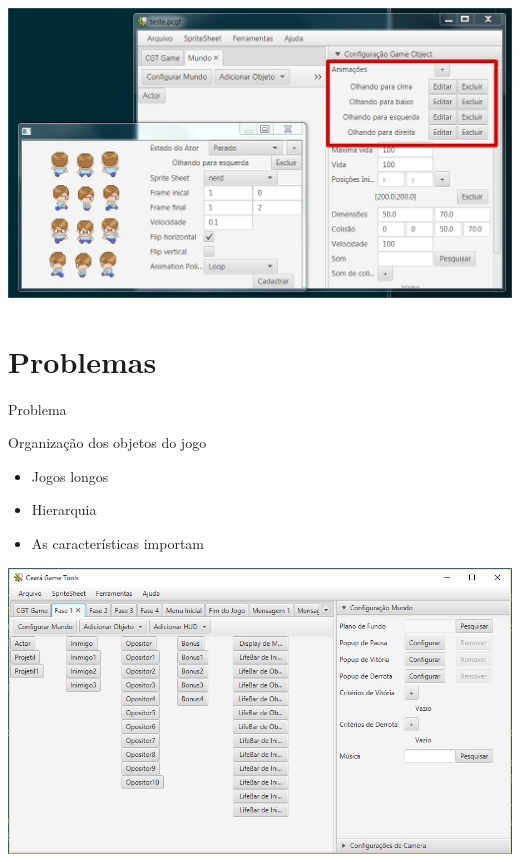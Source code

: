 \documentclass{beamer}
\begin{document}
   \begin{frame}
      \includegraphics[width=\textwidth]{images/problema-2.jpg}
   \end{frame}

   \section{Problemas}
   \begin{frame}{Problema}
      \begin{block}{Organização dos objetos do jogo}
         \begin{itemize}
            \item<+-> Jogos longos
            \item<+-> Hierarquia
            \item<+-> As características importam
         \end{itemize}
      \end{block}
   \end{frame}

   \begin{frame}
      \includegraphics[width=\textwidth]{images/objetos_disposicao.jpg}
   \end{frame}
\end{document}
